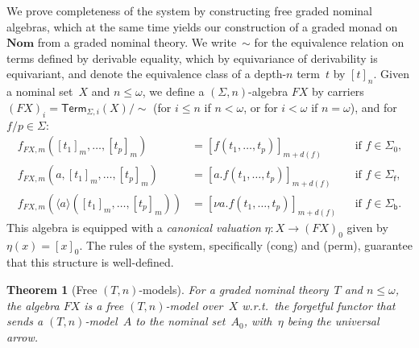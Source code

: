\documentclass[11pt,a4paper]{amsart}
\newtheorem{theorem}{Theorem}[section]
\newcommand{\Term}{\mathsf{Term}}
\newcommand{\sig}{\Sigma}
\newcommand{\sigp}{\Sigma_0}
\newcommand{\sigf}{\Sigma_{\mathsf f}}
\newcommand{\sigb}{\Sigma_{\mathsf b}}
\newcommand{\bind}[1]{\langle #1\rangle}
\theoremstyle{plain}
\numberwithin{equation}{section}
\newcommand{\+}[1]{\mathcal{#1}\xspace}
\newcommand{\Nom}{\mathbf{Nom}}
\theoremstyle{definition}
\begin{document}
\noindent We prove completeness of the system by constructing free
graded nominal algebras, which at the same time yields our
construction of a graded monad on $\Nom$ from a graded nominal
theory. We write~$\sim$ for the equivalence relation on terms defined
by derivable equality, which by equivariance of derivability
is equivariant, and denote
the equivalence class of a depth-$n$ term~$t$ by $[t]_n$. Given a
nominal set~$X$ and $n\le\omega$, we define a $(\Sigma,n)$-algebra
$FX$ by carriers $(FX)_i = \Term_{\sig, i}(X)/{\sim}$ (for $i \le n$
if $n<\omega$, or for $i<\omega$ if $n=\omega$), and for
$f/p \in \Sigma$:
\begin{align*}
  f_{FX, m}([t_1]_m, \ldots, [t_p]_m) &= [f(t_1, \ldots, t_p)]_{m + d(f)} && \text{if $f \in \sigp$,} \\
  f_{FX, m}(a, [t_1]_m, \ldots, [t_p]_m) &= [a.f(t_1, \ldots, t_p)]_{m + d(f)} && \text{if $f \in \sigf$,} \\
  f_{FX, m}(\bind{a} ([t_1]_m, \ldots, [t_p]_m)) &= [\nu a.f(t_1, \ldots, t_p)]_{m + d(f)} && \text{if $f \in \sigb$.}
\end{align*}
This algebra is equipped with a \emph{canonical valuation}
$\eta\colon X\to (FX)_0$ given by $\eta(x)=[x]_0$. The rules of the
system, specifically (cong) and (perm), guarantee that this structure
is well-defined.

\begin{theorem}[Free $(T,n)$-models]\label{thm:free}
  For a graded nominal theory~$T$ and $n\le\omega$, the algebra $FX$
  is a free $(T,n)$-model over~$X$ w.r.t.\ the forgetful functor that
  sends a $(T,n)$-model~$A$ to the nominal set~$A_0$, with~$\eta$
  being the universal arrow.
\end{theorem}
\end{document}

